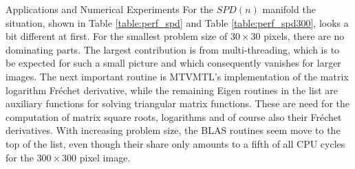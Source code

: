 \begin{chapter}{Applications and Numerical Experiments}
For the $SPD(n)$ manifold the situation, shown in Table \ref{table:perf_spd} and Table \ref{table:perf_spd300}, looks a bit different at first. 
For the smallest problem size of $30\times 30$ pixels, there are no dominating parts. The largest contribution is from multi-threading, which is to be expected 
for such a small picture and which consequently vanishes for larger images. 
The next important routine is MTVMTL's implementation of the matrix logarithm Fr\'{e}chet derivative, while the remaining Eigen routines in the
list are auxiliary functions for solving triangular matrix functions. These are need for the computation of matrix square roots, logarithms and of course also their
Fr\'{e}chet derivatives. With increasing problem size, the BLAS routines seem move to the top of the list, even though their share only amounts 
to a fifth of all CPU cycles for the $300\times 300$ pixel image. \\
\begin{figure}[h!]
    \centering
\end{figure}
\begin{table}[h!]
\centering
\footnotesize
\setlength{\tabcolsep}{3pt}
\end{table}
\end{chapter}
